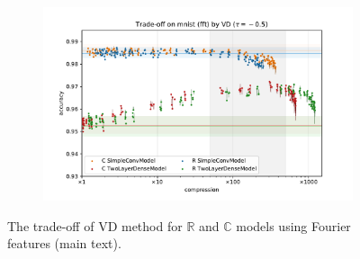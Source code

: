 \documentclass[a4paper,10pt]{article}
\newcommand{\real}{\mathbb{R}}
\newcommand{\cplx}{\mathbb{C}}
\begin{document}
\begin{figure}[b]
\begin{subfigure}[b]{0.5\textwidth}
  \end{subfigure}%
  \begin{subfigure}[b]{0.5\textwidth}
    \centering
    \includegraphics[width=\linewidth]{figure__mnist-like__trade-off/legacy__VD__mnist__fft__-0.5.pdf}
  \end{subfigure}
  \caption{%
    The trade-off of VD method for $\real$ and $\cplx$ models using Fourier features (main text).
  }
  \label{fig:paper__mnist-like__trade-off__VD__fft}
\end{figure}
\end{document}
